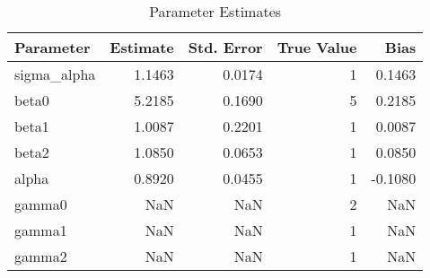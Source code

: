 \begin{table}
\caption{Parameter Estimates}
\begin{tabular}{lrrrr}
\toprule
Parameter & Estimate & Std. Error & True Value & Bias \\
\midrule
sigma_alpha & 1.1463 & 0.0174 & 1 & 0.1463 \\
beta0 & 5.2185 & 0.1690 & 5 & 0.2185 \\
beta1 & 1.0087 & 0.2201 & 1 & 0.0087 \\
beta2 & 1.0850 & 0.0653 & 1 & 0.0850 \\
alpha & 0.8920 & 0.0455 & 1 & -0.1080 \\
gamma0 & NaN & NaN & 2 & NaN \\
gamma1 & NaN & NaN & 1 & NaN \\
gamma2 & NaN & NaN & 1 & NaN \\
\bottomrule
\end{tabular}
\end{table}
